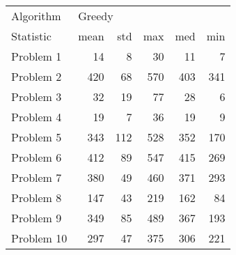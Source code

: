 \begin{tabular}{lrrrrr}
\toprule
Algorithm & \multicolumn{5}{l}{Greedy} \\
Statistic &   mean &  std &  max &  med &  min \\
\midrule
Problem 1  &     14 &    8 &   30 &   11 &    7 \\
Problem 2  &    420 &   68 &  570 &  403 &  341 \\
Problem 3  &     32 &   19 &   77 &   28 &    6 \\
Problem 4  &     19 &    7 &   36 &   19 &    9 \\
Problem 5  &    343 &  112 &  528 &  352 &  170 \\
Problem 6  &    412 &   89 &  547 &  415 &  269 \\
Problem 7  &    380 &   49 &  460 &  371 &  293 \\
Problem 8  &    147 &   43 &  219 &  162 &   84 \\
Problem 9  &    349 &   85 &  489 &  367 &  193 \\
Problem 10 &    297 &   47 &  375 &  306 &  221 \\
\bottomrule
\end{tabular}
